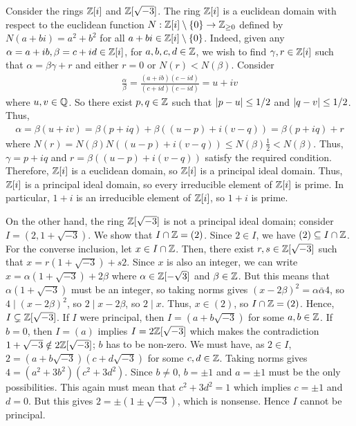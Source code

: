 \begin{example}
    Consider the rings $\mathbb{Z}[i]$ and $\mathbb{Z}[\sqrt{-3}]$. The ring $\mathbb{Z}[i]$ is a euclidean domain with respect to the euclidean function $N : \mathbb{Z}[i] \setminus \{0\} \to \mathbb{Z}_{\geq 0}$ defined by $N(a+bi) = a^{2} + b^{2}$ for all $a+bi \in \mathbb{Z}[i] \setminus \{0\}$.
    Indeed, given any $\alpha = a+ib, \beta = c+id \in \mathbb{Z}[i]$, for $a,b,c,d \in \mathbb{Z}$, we wish to find $\gamma,r \in \mathbb{Z}[i]$ such that $\alpha = \beta \gamma + r$ and either $r = 0$ or $N(r) < N(\beta)$. Consider
    \begin{align}
        \frac{\alpha}{\beta} = \frac{(a+ib)(c-id)}{(c+id)(c-id)} = u+iv
    \end{align}
    where $u,v \in \mathbb{Q}$. So there exist $p,q \in \mathbb{Z}$ such that $\left| p-u \right| \leq 1/2$ and $\left| q-v \right| \leq 1/2$. Thus,
    \begin{align}
        \alpha = \beta(u+iv) = \beta(p+iq) + \beta((u-p)+i(v-q)) = \beta(p+iq) + r
    \end{align}
    where $N(r) = N(\beta)N((u-p)+i(v-q)) \leq N(\beta) \frac{1}{2} < N(\beta)$. Thus, $\gamma = p+iq$ and $r = \beta((u-p)+i(v-q))$ satisfy the required condition. Therefore, $\mathbb{Z}[i]$ is a euclidean domain, so $\mathbb{Z}[i]$ is a principal ideal domain. Thus, $\mathbb{Z}[i]$ is a principal ideal domain, so every irreducible element of $\mathbb{Z}[i]$ is prime. In particular, $1+i$ is an irreducible element of $\mathbb{Z}[i]$, so $1+i$ is prime.
    
    On the other hand, the ring $\mathbb{Z}[\sqrt{-3}]$ is not a principal ideal domain; consider $I = (2,1+\sqrt{-3})$. We show that $I \cap \mathbb{Z} = (2)$. Since $2 \in I$, we have $(2) \subseteq I \cap \mathbb{Z}$. For the converse inclusion, let $x \in I \cap \mathbb{Z}$. Then, there exist $r,s \in \mathbb{Z}[\sqrt{-3}]$ such that $x = r(1+\sqrt{-3}) + s2$. Since $x$ is also an integer, we can write $x = \alpha(1+\sqrt{-3}) + 2 \beta$ where $\alpha \in \mathbb{Z}[-\sqrt{3}]$ and $\beta \in \mathbb{Z}$. But this means that $\alpha(1+\sqrt{-3})$ must be an integer, so taking norms gives $(x-2\beta)^{2} = \alpha\bar{\alpha}4$, so $4 \mid (x-2\beta)^{2}$, so $2 \mid x-2\beta$, so $2 \mid x$. Thus, $x \in (2)$, so $I \cap \mathbb{Z} = (2)$. Hence, $I \subsetneq \mathbb{Z}[\sqrt{-3}]$. If $I$ were principal, then $I = (a+b\sqrt{-3})$ for some $a,b \in \mathbb{Z}$. If $b = 0$, then $I = (a)$ implies $I = 2\mathbb{Z}[\sqrt{-3}]$ which makes the contradiction $1+\sqrt{-3} \notin 2\mathbb{Z}[\sqrt{-3}]$; $b$ has to be non-zero. We must have, as $2 \in I$, $2 = (a+b\sqrt{-3})(c+d\sqrt{-3})$ for some $c,d \in \mathbb{Z}$. Taking norms gives $4 = (a^{2}+3b^{2})(c^{2}+3d^{2})$. Since $b \neq 0$, $b = \pm 1$ and $a = \pm 1$ must be the only possibilities. This again must mean that $c^{2}+3d^{2} = 1$ which implies $c = \pm 1$ and $d = 0$. But this gives $2 = \pm(1 \pm \sqrt{-3})$, which is nonsense. Hence $I$ cannot be principal.
\end{example}

